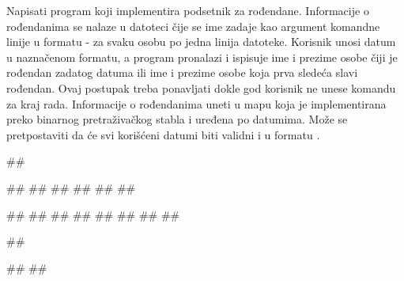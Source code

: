 \begin{Exercise}[label=706, difficulty=1]
Napisati program koji implementira podsetnik za rođendane. Informacije o rođendanima se nalaze u datoteci čije se ime zadaje kao argument komandne linije u formatu  - za svaku osobu po jedna linija datoteke. Korisnik unosi datum u naznačenom formatu, a program pronalazi i ispisuje ime i prezime osobe čiji je rođendan zadatog datuma ili ime i prezime osobe koja prva sledeća slavi rođendan. Ovaj postupak treba ponavljati dokle god korisnik ne unese komandu za kraj rada. Informacije o rođendanima uneti u mapu koja je implementirana preko binarnog pretraživačkog stabla i uređena po datumima. Može se pretpostaviti da će svi korišćeni datumi biti validni i u formatu .

\begin{miditest}
\begin{upotreba}{1}
##
  
##
##
##
##
##
##

#\naslovInt#
##
##
##
##
##
##
##
\end{upotreba}
\end{miditest}
\begin{miditest}
\begin{upotreba}{2}
##
  
#\naslovInt#
##
\end{upotreba}
\end{miditest}
\end{Exercise}

\begin{Answer}[ref=706]
\end{Answer}

